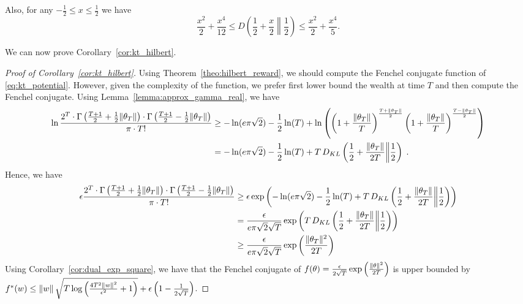 Also, for any $-\frac{1}{2} \leq x\leq \frac{1}{2}$ we have
\[
\frac{x^2}{2} +\frac{x^4}{12}\leq D\left(\frac{1}{2}+\frac{x}{2}\middle\|\frac{1}{2}\right) \leq \frac{x^2}{2} + \frac{x^4}{5}.
\]

We can now prove Corollary~\ref{cor:kt_hilbert}.
\begin{proof}[Proof of Corollary~\ref{cor:kt_hilbert}]
Using Theorem~\ref{theo:hilbert_reward}, we should compute the Fenchel conjugate function of \eqref{eq:kt_potential}.
However, given the complexity of the function, we prefer first lower bound the wealth at time $T$ and then compute the Fenchel conjugate.
Using Lemma~\ref{lemma:approx_gamma_real}, we have
\begin{align*}
\ln \frac{2^T \cdot \Gamma \left(\frac{T+1}{2} + \frac{1}{2} \|\theta_T\| \right) \cdot \Gamma \left(\frac{T+1}{2} - \frac{1}{2} \|\theta_T\| \right)}{\pi \cdot T!} 
&\geq -\ln(e \pi \sqrt{2}) -\frac{1}{2} \ln(T) +\ln \left(\left( 1+\frac{\|\theta_T\|}{T} \right)^\frac{T+\|\theta_T\|}{2} \left( 1+\frac{\|\theta_T\|}{T} \right)^\frac{T-\|\theta_T\|}{2}\right) \\
&= -\ln(e \pi \sqrt{2}) -\frac{1}{2} \ln(T)+ T \, D_{KL}\left(\frac{1}{2}+\frac{\|\theta_T\|}{2T}\middle\|\frac{1}{2}\right) \; .
\end{align*}
Hence, we have
\begin{align*}
\epsilon  \frac{2^T \cdot \Gamma \left(\frac{T+1}{2} + \frac{1}{2} \|\theta_T\| \right) \cdot \Gamma \left(\frac{T+1}{2} - \frac{1}{2} \|\theta_T\| \right)}{\pi \cdot T!} 
&\geq \epsilon \exp\left(-\ln(e \pi \sqrt{2}) -\frac{1}{2} \ln(T) + T \, D_{KL}\left(\frac{1}{2}+\frac{\|\theta_T\|}{2T}\middle\|\frac{1}{2}\right)\right) \\
&= \frac{\epsilon}{e \pi \sqrt{2} \sqrt{T}} \exp\left(T \, D_{KL}\left(\frac{1}{2}+\frac{\|\theta_T\|}{2T}\middle\|\frac{1}{2}\right)\right) \\
&\geq \frac{\epsilon}{e \pi \sqrt{2} \sqrt{T}} \exp\left(\frac{\|\theta_T\|^2}{2T}\right)
\end{align*}
Using Corollary~\ref{cor:dual_exp_square}, we have that the Fenchel conjugate of $f(\theta)=\frac{\epsilon}{2\sqrt{T}} \exp\left(\frac{\left\|{\theta}\right\|^2}{2 T}\right)$ is upper bounded by $f^*(w) \leq \left\|{w}\right\| \sqrt{T \log \left(\frac{4 T^2 \left\|{w}\right\|^2}{\epsilon^2} +1 \right)}+\epsilon\left(1-\frac{1}{2\sqrt{T}}\right)$.
\end{proof}


